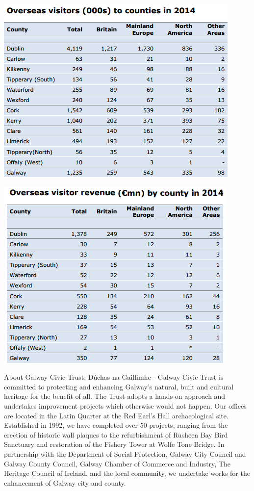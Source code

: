 \begin{center}    
	\includegraphics{img/statsgalway.PNG}
\end{center}
\begin{center}    
	\includegraphics{img/revenue.PNG}
\end{center}



About Galway Civic Trust:  \cite{galwaycivictrust}Dúchas na Gaillimhe - Galway Civic Trust is committed to protecting and enhancing Galway's natural, built and cultural heritage for the benefit of all. The Trust adopts a hands-on approach and undertakes improvement projects which otherwise would not happen. Our offices are located in the Latin Quarter at the Red Earl's Hall archaeological site.
Established in 1992, we have completed over 50 projects, ranging from the erection of historic wall plaques to the refurbishment of Rusheen Bay Bird Sanctuary and restoration of the Fishery Tower at Wolfe Tone Bridge.
In partnership with the Department of Social Protection, Galway City Council and Galway County Council, Galway Chamber of Commerce and Industry, The Heritage Council of Ireland, and the local community, we undertake works for the enhancement of Galway city and county.

